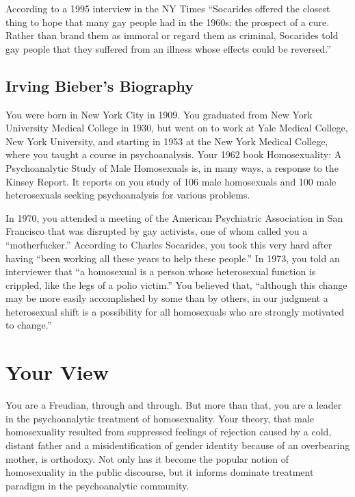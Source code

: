 According to a 1995 interview in the NY Times ``Socarides offered the closest thing to hope that many gay people had in the 1960s: the prospect of a cure. Rather than brand them as immoral or regard them as criminal, Socarides told gay people that they suffered from an illness whose effects could be reversed.''

\subsection{Irving Bieber's Biography}
\label{irvingbiebersbiography}

You were born in New York City in 1909. You graduated from New York University Medical College in 1930, but went on to work at Yale Medical College, New York University, and starting in 1953 at the New York Medical College, where you taught a course in psychoanalysis. Your 1962 book Homosexuality: A Psychoanalytic Study of Male Homosexuals is, in many ways, a response to the Kinsey Report. It reports on you study of 106 male homosexuals and 100 male heterosexuals seeking psychoanalysis for various problems.

In 1970, you attended a meeting of the American Psychiatric Association in San Francisco that was disrupted by gay activists, one of whom called you a ``motherfucker.'' According to Charles Socarides, you took this very hard after having ``been working all these years to help these people.'' In 1973, you told an interviewer that ``a homosexual is a person whose heterosexual function is crippled, like the legs of a polio victim.'' You believed that, ``although this change may be more easily accomplished by some than by others, in our judgment a heterosexual shift is a possibility for all homosexuals who are strongly motivated to change.''

\section{Your View}
\label{yourview}

You are a Freudian, through and through. But more than that, you are a leader in the psychoanalytic treatment of homosexuality. Your theory, that male homosexuality resulted from suppressed feelings of rejection caused by a cold, distant father and a misidentification of gender identity because of an overbearing mother, is orthodoxy. Not only has it become the popular notion of homosexuality in the public discourse, but it informs dominate treatment paradigm in the psychoanalytic community.

